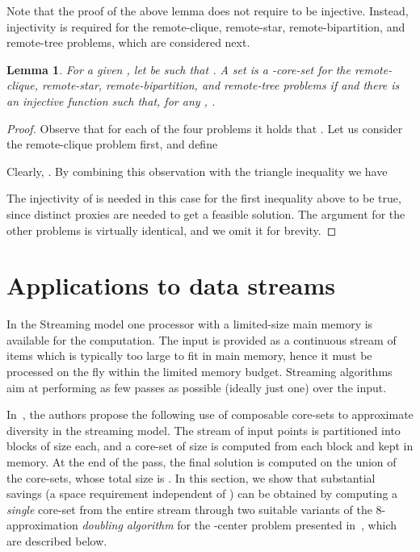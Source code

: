 \documentclass{article}
\newtheorem{lemma}{Lemma}
\begin{document}
Note that the proof of the above lemma does not require  to
be injective. Instead, injectivity is required for the remote-clique,
remote-star, remote-bipartition, and remote-tree problems, which are 
considered next.
\begin{lemma}\label{lem:remote-csbt}
For a given , let  be such that
. A set  is a
-core-set for the remote-clique, remote-star,
remote-bipartition, and remote-tree problems if
 and  there is an injective function  such that,
for any , .
\end{lemma}
\begin{proof}
  Observe that for each of the four problems it holds that
  . Let us consider the
  remote-clique problem first, and define
  
  Clearly, . By combining this observation with the
  triangle inequality we have
  
  The injectivity of  is needed in this case for the first
  inequality above to be true, since  distinct proxies are needed to get a
  feasible solution. The argument for the other problems is virtually
  identical, and we omit it for brevity.
\end{proof}


\section{Applications to data streams}
\label{sec:streaming}

In the Streaming model \cite{RaghavanH99} one processor with a
limited-size main memory is available for the computation. The input
is provided as a continuous stream of items which is typically too
large to fit in main memory, hence it must be processed on the fly
within the limited memory budget.  Streaming algorithms aim at
performing as few passes as possible (ideally just one) over the
input.

In~\cite{IndykMMM14}, the authors propose the following use of
composable core-sets to approximate diversity in the streaming
model. The stream of  input points is partitioned into 
blocks of size  each, and a core-set of size  is
computed from each block and kept in memory. At the end of the pass,
the final solution is computed on the union of the core-sets, whose
total size is . In this section, we show that substantial
savings (a space requirement independent of ) can be obtained by
computing a \emph{single} core-set from the entire stream through two
suitable variants of the 8-approximation \emph{doubling algorithm} for
the -center problem presented in~\cite{CharikarCFM04}, which are
described below.
\end{document}
